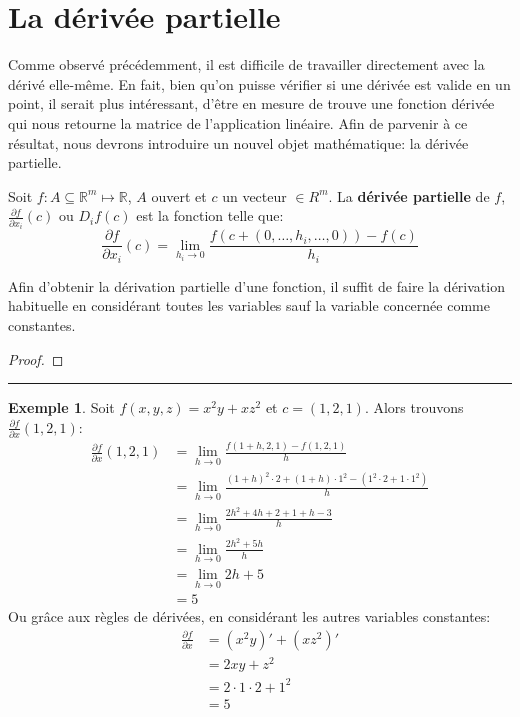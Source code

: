 \documentclass[12pt]{report}
\let\Bbb\mathbb
\theoremstyle{definition}
\newtheorem*{example}{Exemple}
\newenvironment{preuve}{\renewcommand{\proofname}{Preuve}\begin{proof}}{\end{proof}\noindent\textcolor[RGB]{220,220,220}{\rule{\textwidth}{1pt}}}
\begin{document}
\section{La dérivée partielle}
    Comme observé précédemment, il est difficile de travailler directement avec la dérivé elle-même.
    En fait, bien qu'on puisse vérifier si une dérivée est valide en un point, 
    il serait plus intéressant, d'être en mesure de trouve une fonction dérivée qui nous 
    retourne la matrice de l'application linéaire. Afin de parvenir à ce résultat, nous devrons 
    introduire un nouvel objet mathématique: la dérivée partielle.
    \begin{defi}
        \label{def:derivee_partielle_1}
        Soit $f: A \subseteq \Bbb R^m \mapsto \Bbb R$, $A$ ouvert et $c$ un vecteur $\in R^m$.
        La \textbf{dérivée partielle} de $f$, $\frac{\partial f}{\partial x_i}(c)$ ou $D_i f(c)$
        est la fonction telle que:
        $$\frac{\partial f}{\partial x_i}(c) = \lim_{h_i \to 0} \frac{f(c + (0,\dots,h_i,\dots,0)) - f(c)}{h_i}$$
    \end{defi}
    
    \begin{prop}
        Afin d'obtenir la dérivation partielle d'une fonction, il suffit de 
        faire la dérivation habituelle en considérant toutes les variables 
        sauf la variable concernée comme constantes.
    \end{prop}
    \begin{preuve}
        
    \end{preuve}
    \begin{example}
        Soit $f(x,y,z) = x^2y + xz^2$ et $c = (1,2,1)$. 
        Alors trouvons $\frac{\partial f}{\partial x}(1,2,1)$:
        \begin{align*}
            \frac{\partial f}{\partial x}(1,2,1) &= \lim_{h \to 0} \frac{f(1 + h, 2, 1) - f(1, 2, 1)}{h} \\
            &= \lim_{h \to 0} \frac{(1 + h)^2 \cdot 2 + (1 + h) \cdot 1^2 - (1^2\cdot 2 + 1\cdot1^2)}{h} \\
            &= \lim_{h \to 0} \frac{2h^2 + 4h + 2 + 1 + h - 3}{h} \\
            &= \lim_{h \to 0} \frac{2h^2 + 5h}{h} \\
            &= \lim_{h \to 0} 2h + 5 \\
            &= 5
        \end{align*}
        Ou grâce aux règles de dérivées, en considérant les autres variables constantes:
        \begin{align*}
            \frac{\partial f}{\partial x} &= (x^2y)' + (xz^2)' \\
            &= 2xy + z^2 \\
            &= 2 \cdot 1 \cdot 2 + 1^2 \\
            &= 5
        \end{align*}
    \end{example}
\pagebreak
\end{document}

